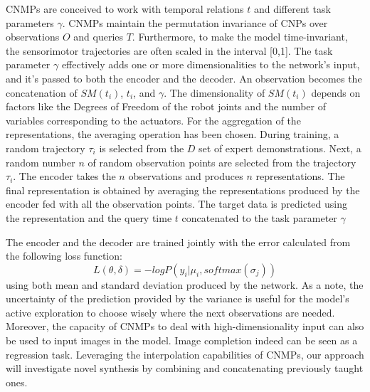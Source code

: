 CNMPs are conceived to work with temporal relations $t$ and different task parameters $\gamma$. CNMPs maintain the permutation invariance of CNPs over observations $O$ and queries $T$. Furthermore, to make the model time-invariant, the sensorimotor trajectories are often scaled in the interval [0,1]. 
The task parameter $\gamma$ effectively adds one or more dimensionalities to the network's input, and it's passed to both the encoder and the decoder. An observation becomes the concatenation of $SM(t_i)$, $t_i$, and $\gamma$. The dimensionality of $SM(t_i)$ depends on factors like the Degrees of Freedom of the robot joints and the number of variables corresponding to the actuators. 
For the aggregation of the representations, the averaging operation has been chosen.
During training, a random trajectory $\tau_i$ is selected from the $D$ set of expert demonstrations. Next, a random number $n$ of random observation points are selected from the trajectory $\tau_i$. The encoder takes the $n$ observations and produces $n$ representations. The final representation is obtained by averaging the representations produced by the encoder fed with all the observation points. 
The target data is predicted using the representation and the query time $t$ concatenated to the task parameter $\gamma$

The encoder and the decoder are trained jointly with the error calculated from the following loss function:
\begin{equation}
    L(\theta, \delta)= -logP(y_i|\mu_i, softmax(\sigma_j))
\end{equation}
using both mean and standard deviation produced by the network.
As a note, the uncertainty of the prediction provided by the variance is useful for the model's active exploration to choose wisely where the next observations are needed.
Moreover, the capacity of CNMPs to deal with high-dimensionality input can also be used to input images in the model. Image completion indeed can be seen as a regression task.
Leveraging the interpolation capabilities of CNMPs, our approach will investigate novel synthesis by combining and concatenating previously taught ones.